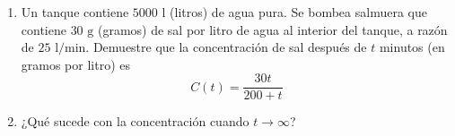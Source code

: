 \item 
\begin{enumerate}
        \item[(a)] Un tanque contiene $5000 \text{ l}$ (litros) de agua pura. Se bombea salmuera que contiene $30 \text{ g}$ (gramos) de sal por litro de agua al interior del tanque, a razón de $25 \text{ l/min}$. Demuestre que la concentración de sal después de $t$ minutos (en gramos por litro) es
        $$C(t) = \frac{30t}{200 + t}$$
        \item[(b)] ¿Qué sucede con la concentración cuando $t \to \infty$?
    \end{enumerate}
